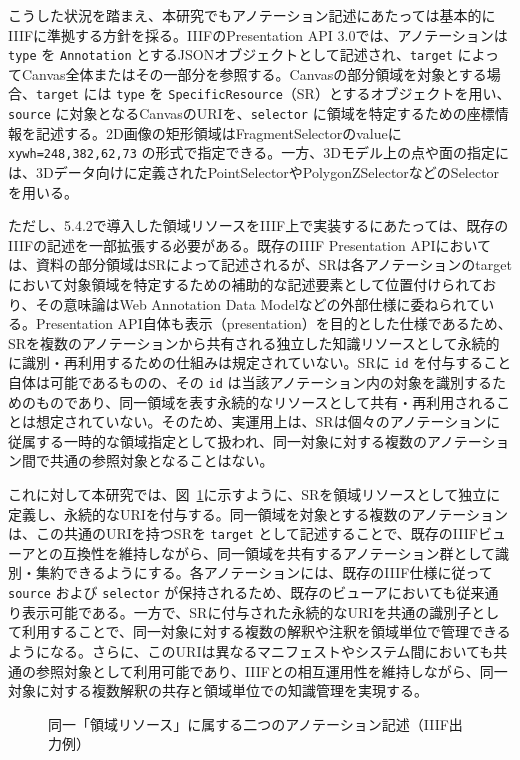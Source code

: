こうした状況を踏まえ、本研究でもアノテーション記述にあたっては基本的にIIIFに準拠する方針を採る。IIIFのPresentation API 3.0では、アノテーションは \texttt{type} を \texttt{Annotation} とするJSONオブジェクトとして記述され、\texttt{target} によってCanvas全体またはその一部分を参照する。Canvasの部分領域を対象とする場合、\texttt{target} には \texttt{type} を \texttt{SpecificResource}（SR）とするオブジェクトを用い、\texttt{source} に対象となるCanvasのURIを、\texttt{selector} に領域を特定するための座標情報を記述する。2D画像の矩形領域はFragmentSelectorのvalueに \texttt{xywh=248,382,62,73} の形式で指定できる。一方、3Dモデル上の点や面の指定には、3Dデータ向けに定義されたPointSelectorやPolygonZSelectorなどのSelectorを用いる。

ただし、5.4.2で導入した領域リソースをIIIF上で実装するにあたっては、既存のIIIFの記述を一部拡張する必要がある。既存のIIIF Presentation APIにおいては、資料の部分領域はSRによって記述されるが、SRは各アノテーションのtargetにおいて対象領域を特定するための補助的な記述要素として位置付けられており、その意味論はWeb Annotation Data Modelなどの外部仕様に委ねられている。Presentation API自体も表示（presentation）を目的とした仕様であるため、SRを複数のアノテーションから共有される独立した知識リソースとして永続的に識別・再利用するための仕組みは規定されていない。SRに \texttt{id} を付与すること自体は可能であるものの、その \texttt{id} は当該アノテーション内の対象を識別するためのものであり、同一領域を表す永続的なリソースとして共有・再利用されることは想定されていない。そのため、実運用上は、SRは個々のアノテーションに従属する一時的な領域指定として扱われ、同一対象に対する複数のアノテーション間で共通の参照対象となることはない。

これに対して本研究では、図~\ref{fig:ch5-iiif-shared-sr}に示すように、SRを領域リソースとして独立に定義し、永続的なURIを付与する。同一領域を対象とする複数のアノテーションは、この共通のURIを持つSRを \texttt{target} として記述することで、既存のIIIFビューアとの互換性を維持しながら、同一領域を共有するアノテーション群として識別・集約できるようにする。各アノテーションには、既存のIIIF仕様に従って \texttt{source} および \texttt{selector} が保持されるため、既存のビューアにおいても従来通り表示可能である。一方で、SRに付与された永続的なURIを共通の識別子として利用することで、同一対象に対する複数の解釈や注釈を領域単位で管理できるようになる。さらに、このURIは異なるマニフェストやシステム間においても共通の参照対象として利用可能であり、IIIFとの相互運用性を維持しながら、同一対象に対する複数解釈の共存と領域単位での知識管理を実現する。

\begin{figure}[htbp]
  \centering
  \caption{同一「領域リソース」に属する二つのアノテーション記述（IIIF出力例）}
  \label{fig:ch5-iiif-shared-sr}
\end{figure}

